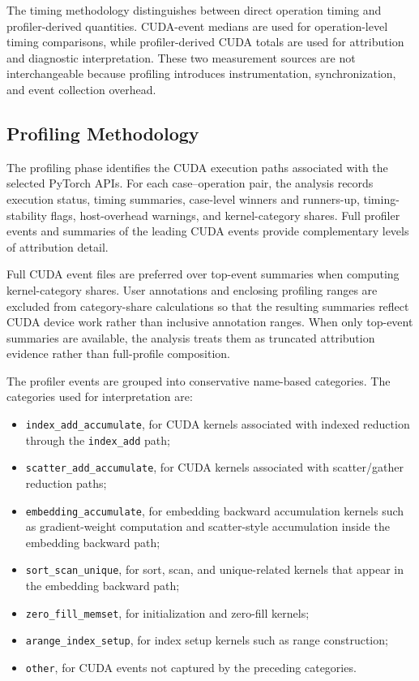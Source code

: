 The timing methodology distinguishes between direct operation timing and profiler-derived quantities. CUDA-event medians are used for operation-level timing comparisons, while profiler-derived CUDA totals are used for attribution and diagnostic interpretation. These two measurement sources are not interchangeable because profiling introduces instrumentation, synchronization, and event collection overhead.

\subsection{Profiling Methodology}

The profiling phase identifies the CUDA execution paths associated with the selected PyTorch APIs. For each case--operation pair, the analysis records execution status, timing summaries, case-level winners and runners-up, timing-stability flags, host-overhead warnings, and kernel-category shares. Full profiler events and summaries of the leading CUDA events provide complementary levels of attribution detail.

Full CUDA event files are preferred over top-event summaries when computing kernel-category shares. User annotations and enclosing profiling ranges are excluded from category-share calculations so that the resulting summaries reflect CUDA device work rather than inclusive annotation ranges. When only top-event summaries are available, the analysis treats them as truncated attribution evidence rather than full-profile composition.

The profiler events are grouped into conservative name-based categories. The categories used for interpretation are:

\begin{itemize}[leftmargin=*]
    \item \texttt{index\_\allowbreak add\_\allowbreak accumulate}, for CUDA kernels associated with indexed reduction through the \texttt{index\_\allowbreak add} path;
    \item \texttt{scatter\_\allowbreak add\_\allowbreak accumulate}, for CUDA kernels associated with scatter/gather reduction paths;
    \item \texttt{embedding\_\allowbreak accumulate}, for embedding backward accumulation kernels such as gradient-weight computation and scatter-style accumulation inside the embedding backward path;
    \item \texttt{sort\_\allowbreak scan\_\allowbreak unique}, for sort, scan, and unique-related kernels that appear in the embedding backward path;
    \item \texttt{zero\_\allowbreak fill\_\allowbreak memset}, for initialization and zero-fill kernels;
    \item \texttt{arange\_\allowbreak index\_\allowbreak setup}, for index setup kernels such as range construction;
    \item \texttt{other}, for CUDA events not captured by the preceding categories.
\end{itemize}

